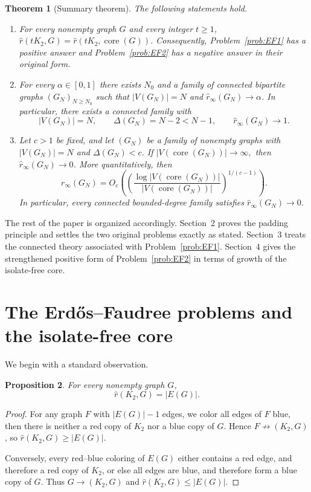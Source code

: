 \documentclass[11pt]{article}
\newcommand{\sr}{\hat r}
\newcommand{\sri}{\hat r_{\infty}}
\newcommand{\core}{\operatorname{core}}
\newtheorem{theorem}{Theorem}[section]
\newtheorem{proposition}[theorem]{Proposition}
\theoremstyle{definition}
\theoremstyle{remark}
\begin{document}
\begin{theorem}[Summary theorem]\label{thm:summary}
The following statements hold.
\begin{enumerate}[label={\rm (\alph*)}]
\item For every nonempty graph $G$ and every integer $t\ge 1$,
$\sr(tK_2,G)=\sr(tK_2,\core(G))$.
Consequently, Problem~\ref{prob:EF1} has a positive answer and
Problem~\ref{prob:EF2} has a negative answer in their original form.

\item For every $\alpha\in[0,1]$ there exists $N_0$ and a family of connected bipartite
graphs $(G_N)_{N\ge N_0}$ such that $|V(G_N)|=N$ and
$\sri(G_N)\to\alpha$.
In particular, there exists a connected family with
\[
|V(G_N)|=N,\qquad \Delta(G_N)=N-2<N-1,\qquad \sri(G_N)\to 1.
\]

\item Let $c>1$ be fixed, and let $(G_N)$ be a family of nonempty graphs with
$|V(G_N)|=N$ and $\Delta(G_N)<c$. If
$|V(\core(G_N))|\to\infty,$
then
$\sri(G_N)\to 0$.
More quantitatively, then
\[
\sri(G_N)=O_c\!\left(\left(\frac{\log |V(\core(G_N))|}{|V(\core(G_N))|}\right)^{1/(c-1)}\right).
\]
In particular, every connected bounded-degree family satisfies $\sri(G_N)\to 0$.
\end{enumerate}
\end{theorem}

The rest of the paper is organized accordingly. Section~2 proves the padding principle and
settles the two original problems exactly as stated. Section~3 treats the connected theory
associated with Problem~\ref{prob:EF1}. Section~4 gives the strengthened positive form of
Problem~\ref{prob:EF2} in terms of growth of the isolate-free core.

\section{The Erd\H{o}s--Faudree problems and the isolate-free core}

We begin with a standard observation.

\begin{proposition}\label{prop:baseK2}
For every nonempty graph $G$,
\[
\sr(K_2,G)=|E(G)|.
\]
\end{proposition}

\begin{proof}
For any graph $F$ with $|E(G)|-1$ edges, we color all edges of $F$ blue, then there is neither a red copy
of $K_2$ nor a blue copy of $G$. Hence $F\not\to(K_2,G)$, so $\sr(K_2,G)\ge |E(G)|$.

Conversely, every red--blue coloring of $E(G)$ either contains a red edge,
and therefore a red copy of $K_2$, or else all edges are blue, and therefore form a blue
copy of $G$. Thus $G\to(K_2,G)$ and $\sr(K_2,G)\le |E(G)|$.
\end{proof}
\end{document}
